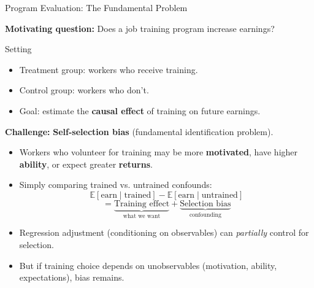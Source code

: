 \documentclass[aspectratio=169, 12pt]{beamer}
\begin{document}
\begin{frame}[shrink=20]{Program Evaluation: The Fundamental Problem}

  \textbf{Motivating question:} Does a job training program increase earnings?

  \medskip

  \begin{examplebox}{Setting}
    \begin{itemize}
      \item Treatment group: workers who receive training.
      \item Control group: workers who don't.
      \item Goal: estimate the \textbf{causal effect} of training on future earnings.
    \end{itemize}
  \end{examplebox}

  \medskip

  \textbf{Challenge:} \textbf{Self-selection bias} (fundamental identification problem).

  \begin{keybox}
    \begin{itemize}
      \item Workers who volunteer for training may be more \textbf{motivated}, have higher \textbf{ability}, or expect greater \textbf{returns}.
      \item Simply comparing trained vs. untrained confounds:
      \[
        \mathbb{E}[\text{earn} \mid \text{trained}] - \mathbb{E}[\text{earn} \mid \text{untrained}]
      \]
      \[
        = \underbrace{\text{Training effect}}_{\text{what we want}} + \underbrace{\text{Selection bias}}_{\text{confounding}}
      \]
      \item Regression adjustment (conditioning on observables) can \textit{partially} control for selection.
      \item But if training choice depends on unobservables (motivation, ability, expectations), bias remains.
    \end{itemize}
  \end{keybox}

\end{frame}
\end{document}
